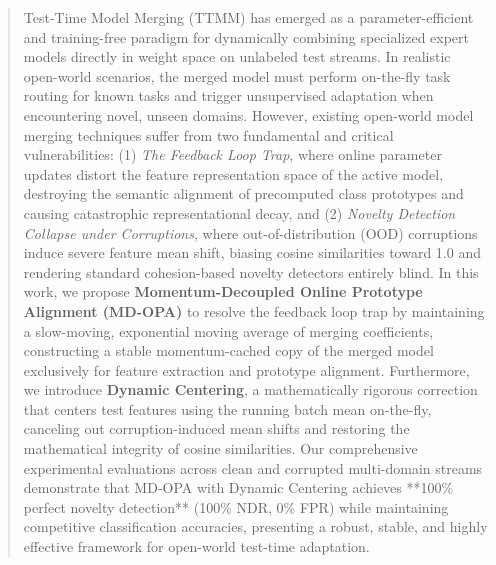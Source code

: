 \documentclass{article}
\theoremstyle{plain}
\theoremstyle{definition}
\theoremstyle{remark}
\begin{document}

\printAffiliationsAndNotice{}

\begin{abstract}
Test-Time Model Merging (TTMM) has emerged as a parameter-efficient and training-free paradigm for dynamically combining specialized expert models directly in weight space on unlabeled test streams. In realistic open-world scenarios, the merged model must perform on-the-fly task routing for known tasks and trigger unsupervised adaptation when encountering novel, unseen domains. However, existing open-world model merging techniques suffer from two fundamental and critical vulnerabilities: (1) \textit{The Feedback Loop Trap}, where online parameter updates distort the feature representation space of the active model, destroying the semantic alignment of precomputed class prototypes and causing catastrophic representational decay, and (2) \textit{Novelty Detection Collapse under Corruptions}, where out-of-distribution (OOD) corruptions induce severe feature mean shift, biasing cosine similarities toward 1.0 and rendering standard cohesion-based novelty detectors entirely blind. In this work, we propose \textbf{Momentum-Decoupled Online Prototype Alignment (MD-OPA)} to resolve the feedback loop trap by maintaining a slow-moving, exponential moving average of merging coefficients, constructing a stable momentum-cached copy of the merged model exclusively for feature extraction and prototype alignment. Furthermore, we introduce \textbf{Dynamic Centering}, a mathematically rigorous correction that centers test features using the running batch mean on-the-fly, canceling out corruption-induced mean shifts and restoring the mathematical integrity of cosine similarities. Our comprehensive experimental evaluations across clean and corrupted multi-domain streams demonstrate that MD-OPA with Dynamic Centering achieves **100\% perfect novelty detection** (100\% NDR, 0\% FPR) while maintaining competitive classification accuracies, presenting a robust, stable, and highly effective framework for open-world test-time adaptation.
\end{abstract}
\end{document}
